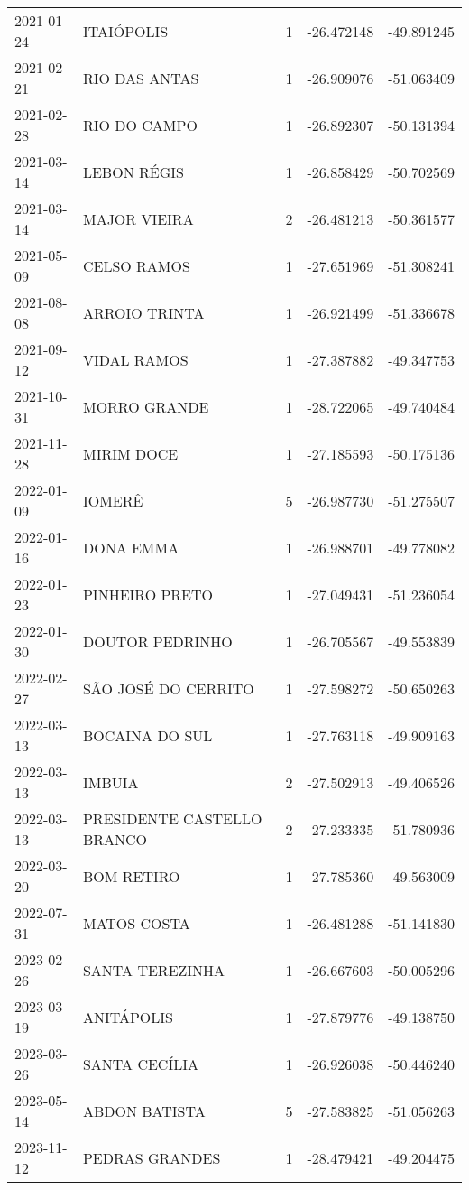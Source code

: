 \documentclass[
	12pt,				%
	openright,			%
	oneside,			%
	a4paper,			%
	english,			%
	french,				%
	spanish,			%
	brazil				%
	dvipsnames, table]{abntex2}
\begin{document}
\begin{longtable}[htbp]{llcrr}
2021-01-24 & ITAIÓPOLIS & 1 & -26.472148 & -49.891245 \\
2021-02-21 & RIO DAS ANTAS & 1 & -26.909076 & -51.063409 \\
2021-02-28 & RIO DO CAMPO & 1 & -26.892307 & -50.131394 \\
2021-03-14 & LEBON RÉGIS & 1 & -26.858429 & -50.702569 \\
2021-03-14 & MAJOR VIEIRA & 2 & -26.481213 & -50.361577 \\
2021-05-09 & CELSO RAMOS & 1 & -27.651969 & -51.308241 \\
2021-08-08 & ARROIO TRINTA & 1 & -26.921499 & -51.336678 \\
2021-09-12 & VIDAL RAMOS & 1 & -27.387882 & -49.347753 \\
2021-10-31 & MORRO GRANDE & 1 & -28.722065 & -49.740484 \\
2021-11-28 & MIRIM DOCE & 1 & -27.185593 & -50.175136 \\
2022-01-09 & IOMERÊ & 5 & -26.987730 & -51.275507 \\
2022-01-16 & DONA EMMA & 1 & -26.988701 & -49.778082 \\
2022-01-23 & PINHEIRO PRETO & 1 & -27.049431 & -51.236054 \\
2022-01-30 & DOUTOR PEDRINHO & 1 & -26.705567 & -49.553839 \\
2022-02-27 & SÃO JOSÉ DO CERRITO & 1 & -27.598272 & -50.650263 \\
2022-03-13 & BOCAINA DO SUL & 1 & -27.763118 & -49.909163 \\
2022-03-13 & IMBUIA & 2 & -27.502913 & -49.406526 \\
2022-03-13 & PRESIDENTE CASTELLO BRANCO & 2 & -27.233335 & -51.780936 \\
2022-03-20 & BOM RETIRO & 1 & -27.785360 & -49.563009 \\
2022-07-31 & MATOS COSTA & 1 & -26.481288 & -51.141830 \\
2023-02-26 & SANTA TEREZINHA & 1 & -26.667603 & -50.005296 \\
2023-03-19 & ANITÁPOLIS & 1 & -27.879776 & -49.138750 \\
2023-03-26 & SANTA CECÍLIA & 1 & -26.926038 & -50.446240 \\
2023-05-14 & ABDON BATISTA & 5 & -27.583825 & -51.056263 \\
2023-11-12 & PEDRAS GRANDES & 1 & -28.479421 & -49.204475 \\
\end{longtable}
\end{document}
